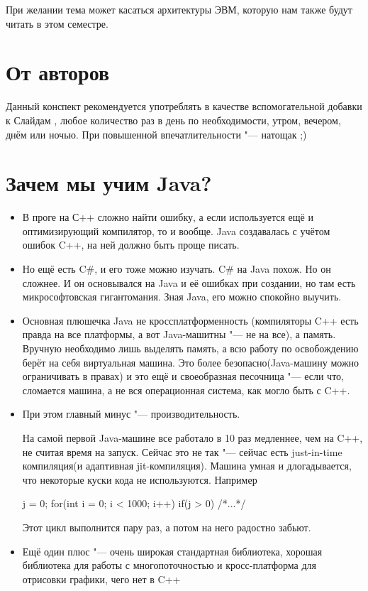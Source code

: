 При желании тема может касаться архитектуры ЭВМ, 
которую нам также будут читать в этом семестре.

\section{От авторов}

Данный конспект рекомендуется употреблять в качестве вспомогательной
добавки к Слайдам%
, любое количество раз в день по необходимости, 
утром, вечером, днём или ночью. При повышенной впечатлительности "--- 
натощак ;)



\section{Зачем мы учим Java?}

\begin{itemize}
	\item В проге на С++ сложно найти ошибку, а если используется 
		ещё и оптимизирующий компилятор, то и вообще.
		Java создавалась с учётом ошибок C++, 
		на ней должно быть проще писать.
	
	\item Но ещё есть C\#, и его тоже можно изучать. 
		C\# на Java похож. Но он сложнее. 
		И он основывался на Java и её ошибках при создании,
		но там есть микрософтовская гигантомания. 
		Зная Java, его можно спокойно выучить.
	
	\item Основная плюшечка Java не кроссплатформенность
		(компиляторы C++ есть правда на все платформы, а вот
		Java-машитны "--- не на все), а память. 
		Вручную необходимо лишь выделять память, 
		а всю работу по освобождению берёт на себя виртуальная 
		машина. Это более безопасно(Java-машину можно 
		ограничивать в правах) и это ещё и своеобразная 
		песочница "---
		если что, сломается машина, а не вся операционная 
		система, как могло быть с C++.
	
	\item При этом главный минус "--- производительность.

		На самой первой Java-машине все работало в 10 раз 
		медленнее, чем на C++, не считая время на запуск.
		Сейчас это не так "--- сейчас есть 
		just-in-time компиляция(и адаптивная jit-компиляция). 
		Машина умная и длогадывается, что некоторые куски
		кода не используются. Например
		
		\begin{javacode}
			j = 0;
			for(int i = 0; i < 1000; i++) {
				if(j > 0) {
					/*...*/
				}
			}
		\end{javacode}

		Этот цикл выполнится пару раз, а потом на него 
		радостно забьют.

	
	\item Ещё один плюс "--- очень широкая стандартная библиотека,
		хорошая библиотека для работы с многопоточностью и
		кросс-платформа для отрисовки графики, чего нет в  C++
\end{itemize}


